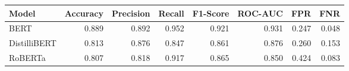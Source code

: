 \begin{tabular}{|l||r|r|r|r|r|r|r|}
\toprule
Model & \textbf{Accuracy} & \textbf{Precision} & Recall & \textbf{F1-Score} & \textbf{ROC-AUC} & \textbf{FPR} & FNR \\
\midrule \midrule
BERT & 0.889 & 0.892 & 0.952 & 0.921 & 0.931 & 0.247 & 0.048 \\
DistilliBERT & 0.813 & 0.876 & 0.847 & 0.861 & 0.876 & 0.260 & 0.153 \\
RoBERTa & 0.807 & 0.818 & 0.917 & 0.865 & 0.850 & 0.424 & 0.083 \\
\bottomrule
\end{tabular}
